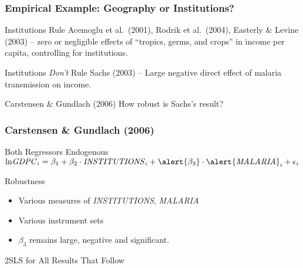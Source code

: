 \begin{frame}
\footnotesize
\begin{figure}
	\centering
	
\end{figure}
\end{frame}
\begin{frame}
\footnotesize
\begin{figure}
	\centering
	
\end{figure}
\end{frame}
\begin{frame}
	
	\frametitle{Empirical Example: Geography or Institutions?}
	
	\begin{block}{Institutions Rule}
	Acemoglu et al.\ (2001), Rodrik et al.\ (2004), Easterly \& Levine (2003) -- zero or negligible effects of ``tropics, germs, and crops''  in income per capita, controlling for institutions.
	\end{block}
	
	\begin{block}{Institutions \emph{Don't} Rule}
	Sachs (2003) -- Large negative direct effect of malaria transmission on income.
	\end{block}
	
	\begin{alertblock}{Carstensen \& Gundlach (2006)}
	How robust is Sachs's result? 
	\end{alertblock}

\end{frame}




\begin{frame}

	\frametitle{Carstensen \& Gundlach (2006)}

	\begin{block}{Both Regressors Endogenous}
		$\mbox{ln\emph{GDPC}}_i = \beta_1 + \beta_2 \cdot \mbox{\emph{INSTITUTIONS}}_i + \alert{\beta_3} \cdot \mbox{\alert{\emph{MALARIA}}}_i + \epsilon_i$
	
	\end{block}

	\begin{block}{Robustness}
		\begin{itemize}
			\item Various measures of \emph{INSTITUTIONS}, \emph{MALARIA}
			\item Various instrument sets
			\item \alert{$\beta_3$ remains large, negative and significant.}
		\end{itemize}
	\end{block}

		\begin{block}{2SLS for All Results That Follow}
	\end{block}


\end{frame}

